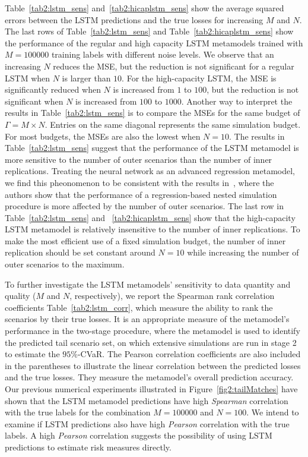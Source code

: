 Table~\ref{tab2:lstm_sens} and~\ref{tab2:hicaplstm_sens} show the average squared errors between the LSTM predictions and the true losses for increasing $M$ and $N$.
The last rows of Table~\ref{tab2:lstm_sens} and Table~\ref{tab2:hicaplstm_sens} show the performance of the regular and high capacity LSTM metamodels trained with $M=\num{100000}$ training labels with different noise levels.
We observe that an increasing $N$ reduces the MSE, but the reduction is not significant for a regular LSTM when $N$ is larger than $\num{10}$.
For the high-capacity LSTM, the MSE is significantly reduced when $N$ is increased from $\num{1}$ to $\num{100}$, but the reduction is not significant when $N$ is increased from $\num{100}$ to $\num{1000}$.
Another way to interpret the results in Table~\ref{tab2:lstm_sens} is to compare the MSEs for the same budget of $\Gamma = M \times N$. 
Entries on the same diagonal represents the same simulation budget.
For most budgets, the MSEs are also the lowest when $N = 10$.
The results in Table~\ref{tab2:lstm_sens} suggest that the performance of the LSTM metamodel is more sensitive to the number of outer scenarios than the number of inner replications.
Treating the neural network as an advanced regression metamodel, we find this pheonomenon to be consistent with the results in~\cite{broadie2015risk}, where the authors show that the performance of a regression-based nested simulation procedure is more affected by the number of outer scenarios.
The last row in Table~\ref{tab2:lstm_sens} and ~\ref{tab2:hicaplstm_sens} show that the high-capacity LSTM metamodel is relatively insensitive to the number of inner replications.
To make the most efficient use of a fixed simulation budget, the number of inner replication should be set constant around $N=10$ while increasing the number of outer scenarios to the maximum.

To further investigate the LSTM metamodels' sensitivity to data quantity and quality ($M$ and $N$, respectively), we report the Spearman rank correlation coefficients Table~\ref{tab2:lstm_corr}, which measure the ability to rank the scenarios by their true losses.
It is an appropriate measure of the metamodel's performance in the two-stage procedure, where the metamodel is used to identify the predicted tail scenario set, on which extensive simulations are run in stage 2 to estimate the $95\%$-CVaR.
The Pearson correlation coefficients are also included in the parentheses to illustrate the linear correlation between the predicted losses and the true losses.
They measure the metamodel's overall prediction accuracy.
Our previous numerical experiments illustrated in Figure~\ref{fig2:tailMatches} have shown that the LSTM metamodel predictions have high \textit{Spearman} correlation with the true labels for the combination $M=\num{100000}$ and $N=\num{100}$.
We intend to examine if LSTM predictions also have high \textit{Pearson} correlation with the true labels.
A high \textit{Pearson} correlation suggests the possibility of using LSTM predictions to estimate risk measures directly.

